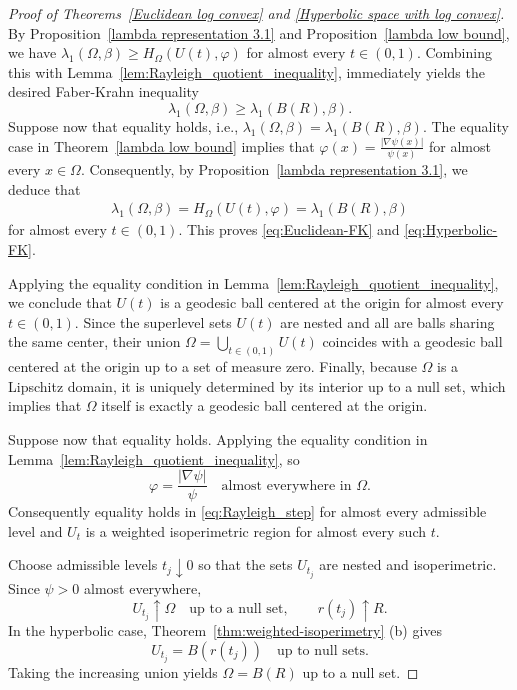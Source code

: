 \documentclass[11pt,leqno]{amsart}
\numberwithin{equation}{section}
\begin{document}
\begin{proof}[Proof of Theorems~\ref{Euclidean log convex} and \ref{Hyperbolic space with log convex}]
By Proposition~\ref{lambda representation 3.1} and Proposition~\ref{lambda low bound}, we have $\lambda_{1}(\Omega,\beta) \geq H_{\Omega}(U(t),\varphi)$ for almost every $t \in (0,1)$. Combining this with Lemma~\ref{lem:Rayleigh_quotient_inequality}, immediately yields the desired Faber-Krahn  inequality $$\lambda_{1}(\Omega,\beta) \geq \lambda_{1}(B(R),\beta).$$ 
Suppose now that equality holds, i.e., $\lambda_{1}(\Omega,\beta) = \lambda_{1}(B(R),\beta)$. The equality case in Theorem~\ref{lambda low bound} implies that $\varphi(x) = \frac{|\nabla \psi(x)|}{\psi(x)}$ for almost every $x \in \Omega$. Consequently, by Proposition~\ref{lambda representation 3.1}, we deduce that 
\begin{align*}
\lambda_{1}(\Omega,\beta) = H_{\Omega}(U(t),\varphi) = \lambda_{1}(B(R),\beta)
\end{align*} 
for almost every $t \in (0,1)$. This proves
\eqref{eq:Euclidean-FK} and \eqref{eq:Hyperbolic-FK}.







Applying the equality condition in Lemma~\ref{lem:Rayleigh_quotient_inequality}, we conclude that $U(t)$ is a geodesic ball centered at the origin for almost every $t \in (0,1)$. Since the superlevel sets $U(t)$ are nested and all are balls sharing the same center, their union $\Omega = \bigcup_{t \in (0,1)} U(t)$ coincides with a geodesic ball centered at the origin up to a set of measure zero. Finally, because $\Omega$ is a Lipschitz domain, it is uniquely determined by its interior up to a null set, which implies that $\Omega$ itself is exactly a geodesic ball centered at the origin.


Suppose now that equality holds. Applying the equality condition in Lemma~\ref{lem:Rayleigh_quotient_inequality}, so
\[
\varphi=\frac{|\nabla\psi|}{\psi}
\quad\text{almost everywhere in }\Omega.
\]
Consequently equality holds in
\eqref{eq:Rayleigh_step} for almost every admissible level and \(U_t\) is a weighted
isoperimetric region for almost every such \(t\).

Choose admissible levels \(t_j\downarrow0\) so that the sets
\(U_{t_j}\) are nested and isoperimetric.  Since \(\psi>0\) almost
everywhere,
\[
U_{t_j}\uparrow\Omega
\quad\text{up to a null set},\qquad
r(t_j)\uparrow R.
\]
In the hyperbolic case, Theorem~\ref{thm:weighted-isoperimetry}
\textup{(b)} gives
\[
U_{t_j}=B(r(t_j))
\quad\text{up to null sets}.
\]
Taking the increasing union yields
\(\Omega=B(R)\) up to a null set.


\end{proof}
\end{document}
